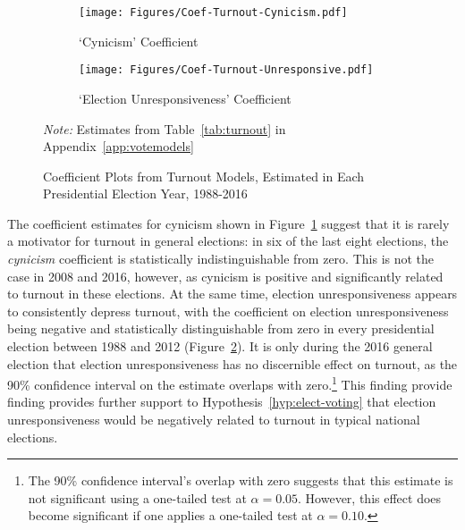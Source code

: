 \documentclass[12pt]{article}
\begin{document}
\begin{figure*}[t!]
    \centering
    \begin{subfigure}[b]{0.475\textwidth}
        \centering
        \texttt{[image: Figures/Coef-Turnout-Cynicism.pdf]}
        \caption{{\small `Cynicism' Coefficient}}    
        \label{fig:turnoutcoef-cynicism}
    \end{subfigure}
    \hfil
    \begin{subfigure}[b]{0.475\textwidth}   
        \centering 
        \texttt{[image: Figures/Coef-Turnout-Unresponsive.pdf]}
        \caption{{\small `Election Unresponsiveness' Coefficient}}    
        \label{fig:turnoutcoef-unresponsiveness}
    \end{subfigure}
    \caption{Coefficient Plots from Turnout Models, Estimated in Each Presidential Election Year, 1988-2016}\label{fig:turnoutcoefs}
    \vspace{-8pt}
    {\scriptsize \textit{Note:} Estimates from Table~\ref{tab:turnout} in Appendix~\ref{app:votemodels} \par}
\end{figure*}

The coefficient estimates for cynicism shown in Figure~\ref{fig:turnoutcoef-cynicism} suggest that it is rarely a motivator for turnout in general elections: in six of the last eight elections, the \textit{cynicism} coefficient is statistically indistinguishable from zero. This is not the case in 2008 and 2016, however, as cynicism is positive and significantly related to turnout in these elections. At the same time, election unresponsiveness appears to consistently depress turnout, with the coefficient on election unresponsiveness being negative and statistically distinguishable from zero in every presidential election between 1988 and 2012 (Figure~\ref{fig:turnoutcoef-unresponsiveness}). It is only during the 2016 general election that election unresponsiveness has no discernible effect on turnout, as the 90\% confidence interval on the estimate overlaps with zero.\footnote{The 90\% confidence interval's overlap with zero suggests that this estimate is not significant using a one-tailed test at $\alpha=0.05$. However, this effect does become significant if one applies a one-tailed test at $\alpha=0.10$.} This finding provide finding provides further support to Hypothesis~\ref{hyp:elect-voting} that election unresponsiveness would be negatively related to turnout in typical national elections. 
\end{document}
